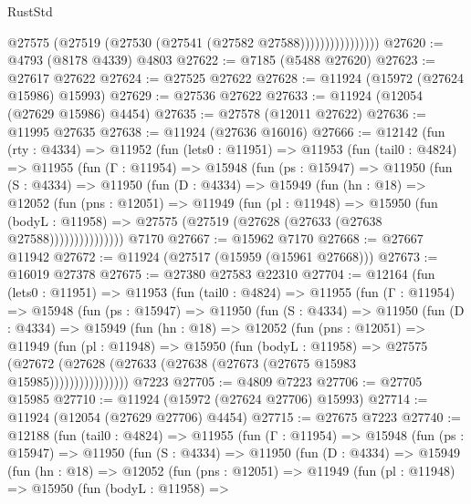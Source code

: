 \begin{lexlean}{RustStd}
\begin{coremodule}
                          @27575 (@27519 (@27530 (@27541 (@27582 @27588))))))))))))))))
@27620 := @4793 (@8178 @4339) @4803
@27622 := @7185 (@5488 @27620)
@27623 := @27617 @27622
@27624 := @27525 @27622
@27628 := @11924 (@15972 (@27624 @15986) @15993)
@27629 := @27536 @27622
@27633 := @11924 (@12054 (@27629 @15986) @4454)
@27635 := @27578 (@12011 @27622)
@27636 := @11995 @27635
@27638 := @11924 (@27636 @16016)
@27666 := @12142
    (fun (rty : @4334) =>
    @11952
      (fun (lets0 : @11951) =>
      @11953
        (fun (tail0 : @4824) =>
        @11955
          (fun (Γ : @11954) =>
          @15948
            (fun (ps : @15947) =>
            @11950
              (fun (S : @4334) =>
              @11950
                (fun (D : @4334) =>
                @15949
                  (fun (hn : @18) =>
                  @12052
                    (fun (pns : @12051) =>
                    @11949
                      (fun (pl : @11948) =>
                      @15950
                        (fun (bodyL : @11958) =>
                        @27575 (@27519 (@27628 (@27633 (@27638 @27588)))))))))))))))
    @7170
@27667 := @15962 @7170
@27668 := @27667 @11942
@27672 := @11924 (@27517 (@15959 (@15961 @27668)))
@27673 := @16019 @27378
@27675 := @27380 @27583 @22310
@27704 := @12164
    (fun (lets0 : @11951) =>
    @11953
      (fun (tail0 : @4824) =>
      @11955
        (fun (Γ : @11954) =>
        @15948
          (fun (ps : @15947) =>
          @11950
            (fun (S : @4334) =>
            @11950
              (fun (D : @4334) =>
              @15949
                (fun (hn : @18) =>
                @12052
                  (fun (pns : @12051) =>
                  @11949
                    (fun (pl : @11948) =>
                    @15950
                      (fun (bodyL : @11958) =>
                      @27575
                        (@27672
                          (@27628 (@27633 (@27638 (@27673 (@27675 @15983 @15985))))))))))))))))
    @7223
@27705 := @4809 @7223
@27706 := @27705 @15985
@27710 := @11924 (@15972 (@27624 @27706) @15993)
@27714 := @11924 (@12054 (@27629 @27706) @4454)
@27715 := @27675 @7223
@27740 := @12188
    (fun (tail0 : @4824) =>
    @11955
      (fun (Γ : @11954) =>
      @15948
        (fun (ps : @15947) =>
        @11950
          (fun (S : @4334) =>
          @11950
            (fun (D : @4334) =>
            @15949
              (fun (hn : @18) =>
              @12052
                (fun (pns : @12051) =>
                @11949
                  (fun (pl : @11948) =>
                  @15950
                    (fun (bodyL : @11958) =>

\end{coremodule}
\end{lexlean}
